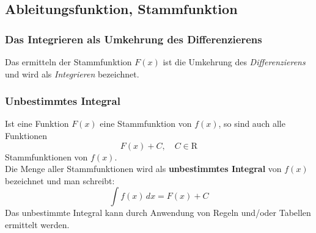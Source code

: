 \pagebreak
\subsection{Ableitungsfunktion, Stammfunktion}
\subsubsection{Das Integrieren als Umkehrung des Differenzierens}
Das ermitteln der Stammfunktion $F(x)$ ist die Umkehrung des \emph{Differenzierens} und wird als \emph{Integrieren} bezeichnet.
\begin{center}
\end{center}
\subsubsection{Unbestimmtes Integral}
Ist eine Funktion $F(x)$ eine Stammfunktion von $f(x)$, so sind auch alle Funktionen
\begin{equation}
    F(x)+C,\quad C\in \mathrm{R}
\end{equation}
Stammfunktionen von $f(x)$. \\
Die Menge aller Stammfunktionen wird als \textbf{unbestimmtes Integral} von $f(x)$ bezeichnet und man schreibt:
\begin{equation}
    \int f(x)\,dx = F(x) + C
\end{equation}
Das unbestimmte Integral kann durch Anwendung von Regeln und/oder Tabellen ermittelt werden.
\\[20pt]


